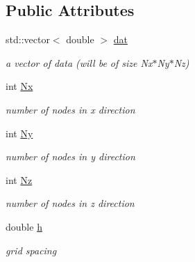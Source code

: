 \subsection*{Public Attributes}
\begin{DoxyCompactItemize}
\item 
\hypertarget{class_data_aafc6f232c04548e989932a16fa5a3119}{}std\+::vector$<$ double $>$ \hyperlink{class_data_aafc6f232c04548e989932a16fa5a3119}{dat}\label{class_data_aafc6f232c04548e989932a16fa5a3119}

\begin{DoxyCompactList}\small\item\em a vector of data (will be of size Nx$\ast$\+Ny$\ast$\+Nz) \end{DoxyCompactList}\item 
\hypertarget{class_data_af922e5e61335d2356f7b5baeefaa5497}{}int \hyperlink{class_data_af922e5e61335d2356f7b5baeefaa5497}{Nx}\label{class_data_af922e5e61335d2356f7b5baeefaa5497}

\begin{DoxyCompactList}\small\item\em number of nodes in x direction \end{DoxyCompactList}\item 
\hypertarget{class_data_a237cd8c4464b0a3600d3f6ed10e376d6}{}int \hyperlink{class_data_a237cd8c4464b0a3600d3f6ed10e376d6}{Ny}\label{class_data_a237cd8c4464b0a3600d3f6ed10e376d6}

\begin{DoxyCompactList}\small\item\em number of nodes in y direction \end{DoxyCompactList}\item 
\hypertarget{class_data_aff55d085686563c59eef1951723e0247}{}int \hyperlink{class_data_aff55d085686563c59eef1951723e0247}{Nz}\label{class_data_aff55d085686563c59eef1951723e0247}

\begin{DoxyCompactList}\small\item\em number of nodes in z direction \end{DoxyCompactList}\item 
\hypertarget{class_data_a500aa544b221d1b75a0ac12cffe6a695}{}double \hyperlink{class_data_a500aa544b221d1b75a0ac12cffe6a695}{h}\label{class_data_a500aa544b221d1b75a0ac12cffe6a695}

\begin{DoxyCompactList}\small\item\em grid spacing \end{DoxyCompactList}\end{DoxyCompactItemize}


